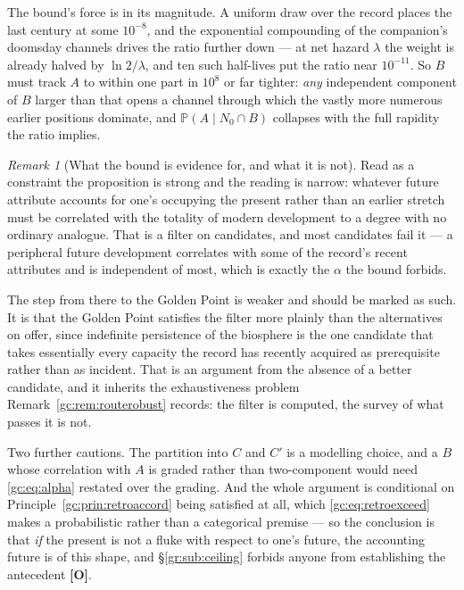 \documentclass[11pt]{article}
\numberwithin{equation}{section}
\theoremstyle{plain}
\theoremstyle{definition}
\theoremstyle{remark}
\newtheorem{remark}[theorem]{Remark}
\newcommand{\PP}{\mathbb{P}}
\begin{document}
The bound's force is in its magnitude. A uniform draw over the record
places the last century at some $10^{-8}$, and the exponential
compounding of the companion's doomsday channels drives the ratio
further down --- at net hazard $\lambda$ the weight is already halved by
$\ln2/\lambda$, and ten such half-lives put the ratio near $10^{-11}$.
So $B$ must track $A$ to within one part in $10^{8}$ or far tighter:
\emph{any} independent component of $B$ larger than that opens a channel
through which the vastly more numerous earlier positions dominate, and
$\PP(A\mid N_0\cap B)$ collapses with the full rapidity the ratio
implies.

\begin{remark}[What the bound is evidence for, and what it is not]
\label{gc:rem:alphareading}
Read as a constraint the proposition is strong and the reading is
narrow: whatever future attribute accounts for one's occupying the
present rather than an earlier stretch must be correlated with the
totality of modern development to a degree with no ordinary analogue.
That is a filter on candidates, and most candidates fail it --- a
peripheral future development correlates with some of the record's
recent attributes and is independent of most, which is exactly the
$\alpha$ the bound forbids.

The step from there to the Golden Point is weaker and should be marked
as such. It is that the Golden Point satisfies the filter more plainly
than the alternatives on offer, since indefinite persistence of the
biosphere is the one candidate that takes essentially every capacity the
record has recently acquired as prerequisite rather than as incident.
That is an argument from the absence of a better candidate, and it
inherits the exhaustiveness problem Remark~\ref{gc:rem:routerobust} records:
the filter is computed, the survey of what passes it is not.

Two further cautions. The partition into $C$ and $C'$ is a modelling
choice, and a $B$ whose correlation with $A$ is graded rather than
two-component would need \eqref{gc:eq:alpha} restated over the grading.
And the whole argument is conditional on
Principle~\ref{gc:prin:retroaccord} being satisfied at all, which
\eqref{gc:eq:retroexceed} makes a probabilistic rather than a categorical
premise --- so the conclusion is that \emph{if} the present is not a
fluke with respect to one's future, the accounting future is of this
shape, and \S\ref{gr:sub:ceiling} forbids anyone from establishing the
antecedent \textbf{[O]}.
\end{remark}
\end{document}
